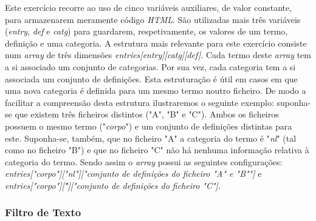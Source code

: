 \documentclass{article}
\begin{document}
Este exercício recorre ao uso de cinco variáveis auxiliares, de valor constante, para armazenarem meramente código \emph{HTML}. São utilizadas mais três variáveis (\emph{entry}, \emph{def} e \emph{catg}) para guardarem, respetivamente, os valores de um termo, definição e uma categoria. A estrutura mais relevante para este exercício consiste num \emph{array} de três dimensões \emph{entries[entry][catg][def]}. Cada termo deste \emph{array} tem a si associado um conjunto de categorias. Por sua vez, cada categoria tem a si associada um conjunto de definições. Esta estruturação é útil em casos em que uma nova categoria é definida para um mesmo termo noutro ficheiro. De modo a facilitar a compreensão desta estrutura ilustraremos o seguinte exemplo: suponha-se que existem três ficheiros distintos ("A", "B" e "C"). Ambos os ficheiros possuem o mesmo termo ("\emph{corpo}") e um conjunto de definições distintas para este. Suponha-se, também, que no ficheiro "A" a categoria do termo é "\emph{nl}" (tal como no ficheiro "B") e que no ficheiro "C" não há nenhuma informação relativa à categoria do termo. Sendo assim o \emph{array} possui as seguintes configurações: \emph{entries["corpo"]["nl"]["conjunto de definições do ficheiro "A" e "B""]} e \emph{entries["corpo"][\" "]["conjunto de definições do ficheiro "C"]}.


\subsubsection{Filtro de Texto}
\end{document}
